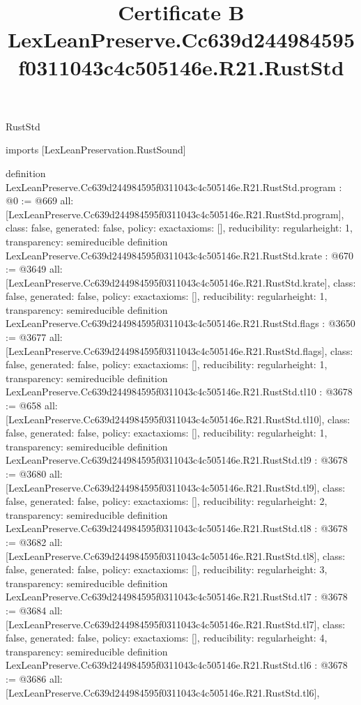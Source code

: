 \begin{lexlean}{RustStd}
\title{Certificate B LexLeanPreserve.Cc639d244984595f0311043c4c505146e.R21.RustStd}
\begin{coremodule}
imports [LexLeanPreservation.RustSound]

definition LexLeanPreserve.Cc639d244984595f0311043c4c505146e.R21.RustStd.program : @0 := @669 {
  all: [LexLeanPreserve.Cc639d244984595f0311043c4c505146e.R21.RustStd.program],
  class: false,
  generated: false,
  policy: exact{axioms: []},
  reducibility: regular{height: 1},
  transparency: semireducible
}
definition LexLeanPreserve.Cc639d244984595f0311043c4c505146e.R21.RustStd.krate : @670 := @3649 {
  all: [LexLeanPreserve.Cc639d244984595f0311043c4c505146e.R21.RustStd.krate],
  class: false,
  generated: false,
  policy: exact{axioms: []},
  reducibility: regular{height: 1},
  transparency: semireducible
}
definition LexLeanPreserve.Cc639d244984595f0311043c4c505146e.R21.RustStd.flags : @3650 := @3677 {
  all: [LexLeanPreserve.Cc639d244984595f0311043c4c505146e.R21.RustStd.flags],
  class: false,
  generated: false,
  policy: exact{axioms: []},
  reducibility: regular{height: 1},
  transparency: semireducible
}
definition LexLeanPreserve.Cc639d244984595f0311043c4c505146e.R21.RustStd.tl10 : @3678 := @658 {
  all: [LexLeanPreserve.Cc639d244984595f0311043c4c505146e.R21.RustStd.tl10],
  class: false,
  generated: false,
  policy: exact{axioms: []},
  reducibility: regular{height: 1},
  transparency: semireducible
}
definition LexLeanPreserve.Cc639d244984595f0311043c4c505146e.R21.RustStd.tl9 : @3678 := @3680 {
  all: [LexLeanPreserve.Cc639d244984595f0311043c4c505146e.R21.RustStd.tl9],
  class: false,
  generated: false,
  policy: exact{axioms: []},
  reducibility: regular{height: 2},
  transparency: semireducible
}
definition LexLeanPreserve.Cc639d244984595f0311043c4c505146e.R21.RustStd.tl8 : @3678 := @3682 {
  all: [LexLeanPreserve.Cc639d244984595f0311043c4c505146e.R21.RustStd.tl8],
  class: false,
  generated: false,
  policy: exact{axioms: []},
  reducibility: regular{height: 3},
  transparency: semireducible
}
definition LexLeanPreserve.Cc639d244984595f0311043c4c505146e.R21.RustStd.tl7 : @3678 := @3684 {
  all: [LexLeanPreserve.Cc639d244984595f0311043c4c505146e.R21.RustStd.tl7],
  class: false,
  generated: false,
  policy: exact{axioms: []},
  reducibility: regular{height: 4},
  transparency: semireducible
}
definition LexLeanPreserve.Cc639d244984595f0311043c4c505146e.R21.RustStd.tl6 : @3678 := @3686 {
  all: [LexLeanPreserve.Cc639d244984595f0311043c4c505146e.R21.RustStd.tl6],
}
\end{coremodule}
\end{lexlean}
